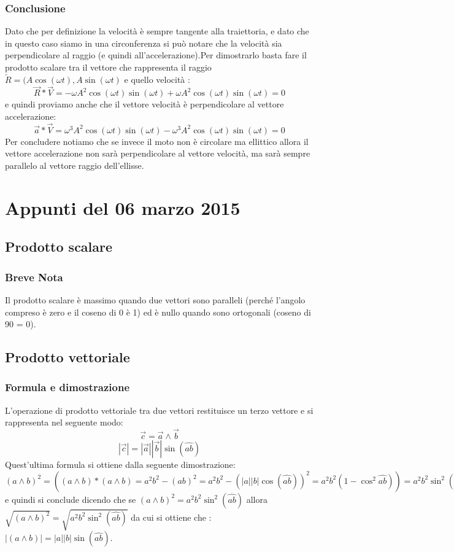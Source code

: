 \documentclass[portrait]{article}
\begin{document}
\subsubsection{Conclusione}
Dato che per definizione la velocità è sempre tangente alla traiettoria, e dato che in questo caso siamo in una circonferenza si può notare che la velocità sia perpendicolare al raggio (e quindi all'accelerazione).Per dimostrarlo basta fare il prodotto scalare tra il vettore che rappresenta il raggio $\overleftarrow{R} = (A\cos(\omega t),A\sin(\omega t)$ e quello velocità : 
$$\overrightarrow{R} * \overrightarrow{V} = -\omega A^2 \cos(\omega t) \sin(\omega t) +\omega A^2 \cos(\omega t) \sin(\omega t) = 0 $$
e quindi proviamo anche che il vettore velocità è perpendicolare al vettore accelerazione:
$$\overrightarrow{a} * \overrightarrow{V} = \omega^3A^2\cos(\omega t) \sin(\omega t) -\omega^3A^2\cos(\omega t) \sin(\omega t) = 0$$
Per concludere notiamo che se invece il moto non è circolare ma ellittico allora il vettore accelerazione non sarà perpendicolare al vettore velocità, ma sarà sempre parallelo al vettore raggio dell'ellisse.
\section{Appunti del 06 marzo 2015}
\subsection{Prodotto scalare}
\subsubsection{Breve Nota}
Il prodotto scalare è massimo quando due vettori sono paralleli (perché l'angolo compreso è zero e il coseno di 0 è 1) ed è nullo quando sono ortogonali (coseno di 90 = 0).
\subsection{Prodotto vettoriale}
\subsubsection{Formula e dimostrazione}
L'operazione di prodotto vettoriale tra due vettori restituisce un terzo vettore e si rappresenta nel seguente modo:
$$\overrightarrow{c} = \overrightarrow{a} \wedge \overrightarrow{b}$$
$$|\overrightarrow{c}|=|\overrightarrow{a}||\overrightarrow{b}|\sin(\widehat{ab})$$
Quest'ultima formula si ottiene dalla seguente dimostrazione:$(a \wedge b)^2 = ((a \wedge b)*(a \wedge b) = a^2b^2 - (ab)^2 = a^2b^2 -(|a||b|\cos(\widehat{ab}))^2 = a^2b^2(1-\cos^2\widehat{ab})) = a^2b^2 \sin^2(\widehat{ab})$ e quindi si conclude dicendo che se $(a \wedge b)^2 = a^2b^2 \sin^2(\widehat{ab}) $ allora $\sqrt{(a \wedge b)^2} = \sqrt{a^2b^2 \sin^2(\widehat{ab})} $ da cui si ottiene che : $|(a \wedge b)| = |a||b|\sin(\widehat{ab})$. 
\end{document}
